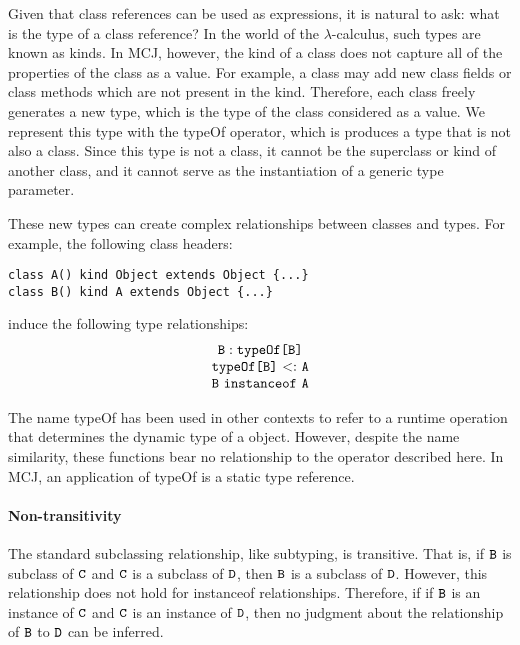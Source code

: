 \documentclass{acmconfbig}
\begin{document}
Given that class references can be used as expressions, it is natural
to ask: what is the type of a class reference?  In the world of the
$\lambda$-calculus, such types are known as kinds.  In MCJ, however,
the kind of a class does not capture all of the properties of the
class as a value.  For example, a class may add new class fields or
class methods which are not present in the kind.  Therefore, each
class freely generates a new type, which is the type of the class
considered as a value.  We represent this type with the {\txt typeOf}
operator, which is produces a type that is not also a class.  Since
this type is not a class, it cannot be the superclass or kind of
another class, and it cannot serve as the instantiation of a generic
type parameter.

These new types can create complex relationships between classes and types.  For
example, the following class headers:

\begin{verbatim}
class A() kind Object extends Object {...}
class B() kind A extends Object {...}
\end{verbatim}

induce the following type relationships:
\begin{displaymath}
\begin{array}{c}
\typ \B {\typeof \B} \\
\subtype {\typeof \B} \A \\
\B~ {\txt instanceof}\ \A
\end{array}
\end{displaymath}

The name {\txt typeOf} has been used in other contexts to refer to a
runtime operation that determines the dynamic type of a object.
However, despite the name similarity, these functions bear no
relationship to the operator described here.  In MCJ, an application
of {\txt typeOf} is a static type reference.

\paragraph{Non-transitivity}

The standard subclassing relationship, like subtyping, is transitive.
That is, if $\mbox {\tt B}$ is subclass of $\mbox {\tt C}$ and $\mbox {\tt C}$ is a subclass of $\mbox {\tt D}$,
then $\mbox {\tt B}$ is a subclass of $\mbox {\tt D}$.  However, this relationship does not
hold for {\txt instanceof} relationships.  Therefore, if if $\mbox {\tt B}$ is an
instance of $\mbox {\tt C}$ and $\mbox {\tt C}$ is an instance of $\mbox {\tt D}$, then no judgment
about the relationship of $\mbox {\tt B}$ to $\mbox {\tt D}$ can be inferred.
\end{document}

